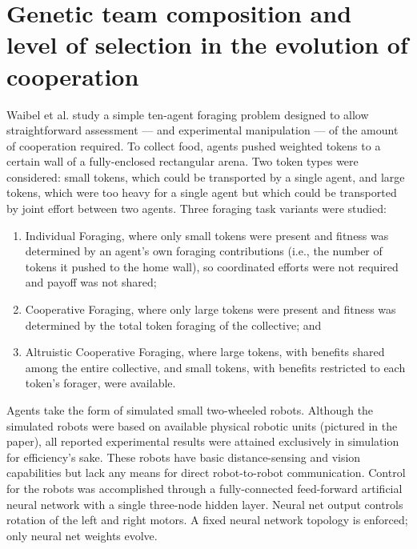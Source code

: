\section{Genetic team composition and level of selection in the evolution of cooperation \cite{waibel2009genetic}}

Waibel et al. study a simple ten-agent foraging problem designed to allow straightforward assessment --- and experimental manipulation --- of the amount of cooperation required.
To collect food, agents pushed weighted tokens to a certain wall of a fully-enclosed rectangular arena.
Two token types were considered: small tokens, which could be transported by a single agent, and large tokens, which were too heavy for a single agent but which could be transported by joint effort between two agents.
Three foraging task variants were studied:
\begin{enumerate}
\item Individual Foraging, where only small tokens were present and fitness was determined by an agent's own foraging contributions (i.e., the number of tokens it pushed to the home wall), so coordinated efforts were not required and payoff was not shared;
\item Cooperative Foraging, where only large tokens were present and fitness was determined by the total token foraging of the collective; and
\item Altruistic Cooperative Foraging, where large tokens, with benefits shared among the entire collective, and small tokens, with benefits restricted to each token's forager, were available.
\end{enumerate}

Agents take the form of simulated small two-wheeled robots.
Although the simulated robots were based on available physical robotic units (pictured in the paper), all reported experimental results were attained exclusively in simulation for efficiency's sake.
These robots have basic distance-sensing and vision capabilities but lack any means for direct robot-to-robot communication.
Control for the robots was accomplished through a fully-connected feed-forward artificial neural network with a single three-node hidden layer.
Neural net output controls rotation of the left and right motors.
A fixed neural network topology is enforced; only neural net weights evolve.
